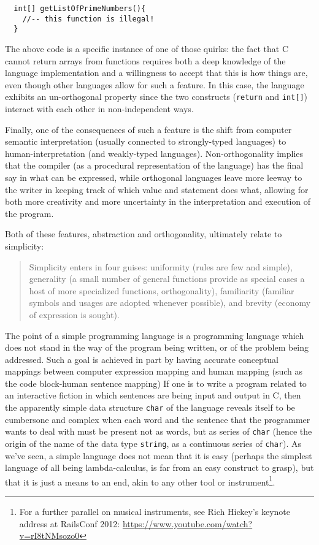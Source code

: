\documentclass{article}
\begin{document}
\begin{lstlisting}
  int[] getListOfPrimeNumbers(){
    //-- this function is illegal!
  }
\end{lstlisting}

The above code is a specific instance of one of those quirks: the fact that C cannot return arrays from functions requires both a deep knowledge of the language implementation and a willingness to accept that this is how things are, even though other languages allow for such a feature. In this case, the language exhibits an un-orthogonal property since the two constructs (\lstinline{return} and \lstinline{int[]}) interact with each other in non-independent ways.

Finally, one of the consequences of such a feature is the shift from computer semantic interpretation (usually connected to strongly-typed languages) to human-interpretation (and weakly-typed languages). Non-orthogonality implies that the compiler (as a procedural representation of the language) has the final say in what can be expressed, while orthogonal languages leave more leeway to the writer in keeping track of which value and statement does what, allowing for both more creativity and more uncertainty in the interpretation and execution of the program.

Both of these features, abstraction and orthogonality, ultimately relate to simplicity:

\begin{quote}
  Simplicity enters in four guises: uniformity (rules are few and simple), generality (a small number of general functions provide as special cases a host of more specialized functions, orthogonality), familiarity (familiar symbols and usages are adopted whenever possible), and brevity (economy of ex­pression is sought).\cite{stansifer_study_1994}
\end{quote}

The point of a simple programming language is a programming language which does not stand in the way of the program being written, or of the problem being addressed. Such a goal is achieved in part by having accurate conceptual mappings between computer expression mapping and human mapping (such as the code block-human sentence mapping\cite{fedorenko_language_2019}) If one is to write a program related to an interactive fiction in which sentences are being input and output in C, then the apparently simple data structure \lstinline{char} of the language reveals itself to be cumbersone and complex when each word and the sentence that the programmer wants to deal with must be present not as words, but as series of \lstinline{char} (hence the origin of the name of the data type \lstinline{string}, as a continuous series of \lstinline{char}). As we've seen, a simple language does not mean that it is easy (perhaps the simplest language of all being lambda-calculus, is far from an easy construct to grasp), but that it is just a means to an end, akin to any other tool or instrument\footnote{For a further parallel on musical instruments, see Rich Hickey's keynote address at RailsConf 2012: \url{https://www.youtube.com/watch?v=rI8tNMsozo0}}.
\end{document}
